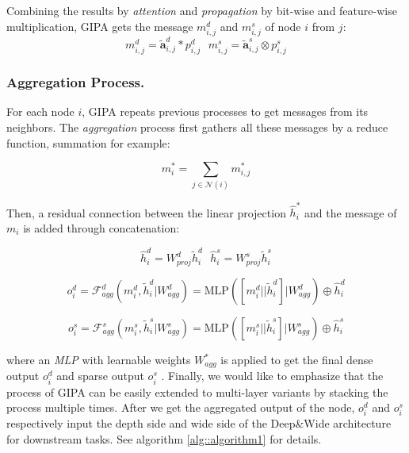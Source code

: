 \documentclass[runningheads]{llncs}
\newcommand{\model}{GIPA\xspace}
\begin{document}
Combining the results by \textit{attention} and \textit{propagation} by bit-wise and feature-wise multiplication, \model gets the message $m_{i, j}^d$ and $m_{i, j}^s$ of node $i$ from $j$:
\begin{equation}
\label{eq:msg}
m_{i, j}^d = \tilde{\bm{a}}_{i, j}^d * p_{i, j}^d \ \ \ m_{i, j}^s = \tilde{\bm{a}}_{i, j}^s \otimes p_{i, j}^s
\end{equation}



\subsubsection{Aggregation Process.}
For each node $i$, \model repeats previous processes to get messages from its neighbors. The \textit{aggregation} process first gathers all these messages by a reduce function, summation for example:

\begin{equation}
\label{eq:sum}
m_{i}^{*} = \sum_{j\in\mathcal{N}(i)}m_{i, j}^{*}
\end{equation}



\noindent Then, a residual connection between the linear projection $\hat{h}_i^*$ and the message of $m_i$ is added through concatenation: 





\begin{equation}
\label{eq:proj}
\hat{h}_i^d=W_{proj}^d\tilde{h}_i^d \ \ \ \hat{h}_i^s=W_{proj}^s\tilde{h}_i^s
\end{equation}

\begin{equation}
\label{eq:agg}
o_{i}^d = \mathcal{F}_{agg}^d(m_{i}^d, \tilde{h}_i^d | W_{agg}^d) = \text{MLP}([m_{i}^d || \tilde{h}_i^d]|W_{agg}^d) \oplus \hat{h}_i^d
\end{equation}

\begin{equation}
\label{eq:agg}
o_{i}^s = \mathcal{F}_{agg}^s(m_{i}^s, \tilde{h}_i^s | W_{agg}^s) = \text{MLP}([m_{i}^s || \tilde{h}_i^s]|W_{agg}^s) \oplus \hat{h}_i^s
\end{equation}

\noindent where an \textit{MLP} with learnable weights $W_{agg}^*$ is applied to get the final dense output $o_{i}^d$ and sparse output $o_{i}^s$ . 
Finally, we would like to emphasize that the process of \model can be easily extended to multi-layer variants by stacking the process multiple times. After we get the aggregated output of the node, $o_{i}^d$ and $o_{i}^s$ respectively input the depth side and wide side of the Deep\&Wide architecture for downstream tasks. See algorithm \ref{alg::algorithm1} for details.
\end{document}
